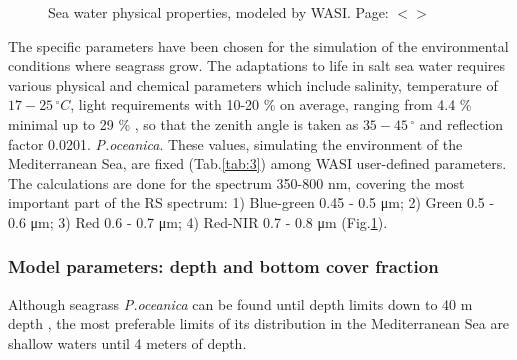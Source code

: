 \documentclass[11pt]{article}
\begin{document}
\begin{figure}[H]
	\centering
	\caption{Sea water physical properties, modeled by \ac{WASI}. Page: $<$\pageref{page-36}$>$}
	\label{fig:4.8}
\end{figure}

The specific parameters have been chosen for the simulation of the environmental conditions where seagrass
grow. The adaptations to life in salt sea water requires various physical and chemical parameters
which include salinity, temperature of $17-25\,^{\circ}C$, light requirements with 10-20 \% on average, ranging
from 4.4 \%  minimal up to 29 \% \cite{McKenzie09}\label{McKenzie09}, so that the zenith angle is taken as $35-45\,^{\circ}$
and reflection factor 0.0201. \textit{P.oceanica}\label{page-36}. These values, simulating the environment of the Mediterranean Sea, are fixed (Tab.\ref{tab:3}) among WASI user-defined parameters.
The calculations are done for the spectrum 350-800 nm, covering the most important part of the RS spectrum: 1) Blue-green 0.45 - 0.5 μm; 2) Green 0.5 - 0.6 μm; 3) Red 0.6 - 0.7 μm; 4) Red-NIR 0.7 - 0.8 μm (Fig.\ref{fig:4.8}).

\subsubsection{Model parameters: depth and bottom cover fraction}
Although seagrass \textit{P.oceanica} can be found until depth limits down to 40 m depth \cite{DenHartog70}\label{DenHartog70}, the most preferable limits of its distribution in the Mediterranean Sea are shallow waters until
4 meters of depth. 
\end{document}
